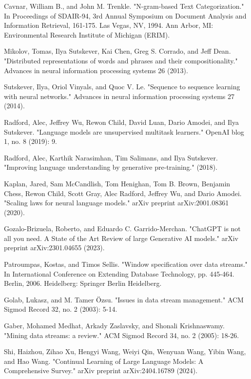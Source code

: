 \documentclass[runningheads]{llncs}
\begin{document}
\begin{thebibliography}{8}
Cavnar, William B., and John M. Trenkle. "N-gram-based Text Categorization." In Proceedings of SDAIR-94, 3rd Annual Symposium on Document Analysis and Information Retrieval, 161-175. Las Vegas, NV, 1994. Ann Arbor, MI: Environmental Research Institute of Michigan (ERIM).

Mikolov, Tomas, Ilya Sutskever, Kai Chen, Greg S. Corrado, and Jeff Dean. "Distributed representations of words and phrases and their compositionality." Advances in neural information processing systems 26 (2013).

Sutskever, Ilya, Oriol Vinyals, and Quoc V. Le. "Sequence to sequence learning with neural networks." Advances in neural information processing systems 27 (2014).

Radford, Alec, Jeffrey Wu, Rewon Child, David Luan, Dario Amodei, and Ilya Sutskever. "Language models are unsupervised multitask learners." OpenAI blog 1, no. 8 (2019): 9.

Radford, Alec, Karthik Narasimhan, Tim Salimans, and Ilya Sutskever. "Improving language understanding by generative pre-training." (2018).

Kaplan, Jared, Sam McCandlish, Tom Henighan, Tom B. Brown, Benjamin Chess, Rewon Child, Scott Gray, Alec Radford, Jeffrey Wu, and Dario Amodei. "Scaling laws for neural language models." arXiv preprint arXiv:2001.08361 (2020).

Gozalo-Brizuela, Roberto, and Eduardo C. Garrido-Merchan. "ChatGPT is not all you need. A State of the Art Review of large Generative AI models." arXiv preprint arXiv:2301.04655 (2023).

Patroumpas, Kostas, and Timos Sellis. "Window specification over data streams." In International Conference on Extending Database Technology, pp. 445-464. Berlin, 2006. Heidelberg: Springer Berlin Heidelberg.

Golab, Lukasz, and M. Tamer Özsu. "Issues in data stream management." ACM Sigmod Record 32, no. 2 (2003): 5-14.

Gaber, Mohamed Medhat, Arkady Zaslavsky, and Shonali Krishnaswamy. "Mining data streams: a review." ACM Sigmod Record 34, no. 2 (2005): 18-26.

Shi, Haizhou, Zihao Xu, Hengyi Wang, Weiyi Qin, Wenyuan Wang, Yibin Wang, and Hao Wang. "Continual Learning of Large Language Models: A Comprehensive Survey." arXiv preprint arXiv:2404.16789 (2024).


\end{thebibliography}
\end{document}
